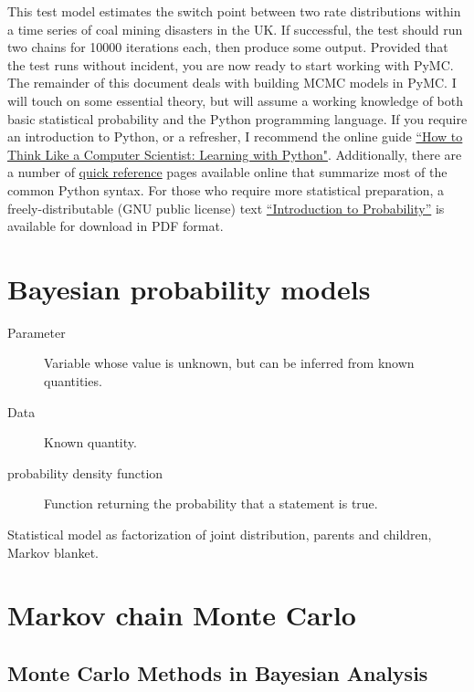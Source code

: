 \documentclass[]{book}
\begin{document}
This test model estimates the switch point between two rate distributions within a time series of coal mining disasters in the UK. If successful, the test should run two chains for 10000 iterations each, then produce some output. Provided that the test runs without incident, you are now ready to start working with PyMC. The remainder of this document deals with building MCMC models in PyMC. I will touch on some essential theory, but will assume a working knowledge of both basic statistical probability and the Python programming language. If you require an introduction to Python, or a refresher, I recommend the online guide \href{http://www.ibiblio.org/obp/thinkCSpy/index.htm}{``How to Think Like a Computer Scientist: Learning with Python"}. Additionally, there are a number of \href{http://rgruet.free.fr/PQR24/PQR2.4.html}{quick reference} pages available online that summarize most of the common Python syntax. For those who require more statistical preparation, a freely-distributable (GNU public license) text \href{https://www.dartmouth.edu/~chance/teaching_aids/books_articles/probability_book/amsbook.mac.pdf}{``Introduction to Probability''} is available for download in PDF format.


\chapter{Bayesian probability models} %
\begin{description}
\item[Parameter] Variable whose value is unknown, but can be inferred from known quantities.
\item[Data] Known quantity.
\item[probability density function] Function returning the probability that a statement is true.
\end{description}

Statistical model as factorization of joint distribution, parents and children, Markov blanket.
\chapter{Markov chain Monte Carlo} %
\label{chap:MCMC} 


\section{Monte Carlo Methods in Bayesian Analysis}
\end{document}
